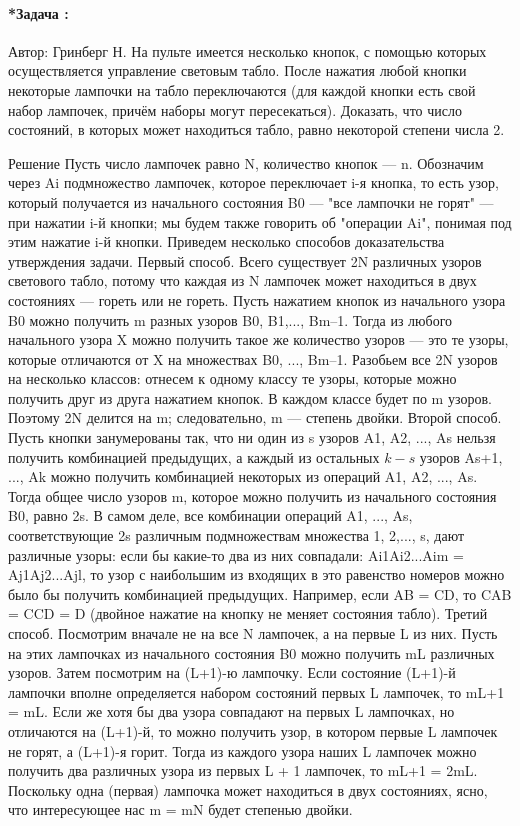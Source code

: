 \documentclass[amsmath,amssymb,12pt]{revtex4}
\newif\ifimportant
\newcommand{\1}{\frac{1}{2}}
\begin{document}
\addtocounter{prn}{1}
\vspace{0.3cm}
\paragraph*{*Задача \theprn: }

Автор: Гринберг Н.
На пульте имеется несколько кнопок, с помощью которых осуществляется управление световым табло. После нажатия любой кнопки некоторые лампочки на табло переключаются (для каждой кнопки есть свой набор лампочек, причём наборы могут пересекаться). Доказать, что число состояний, в которых может находиться табло, равно некоторой степени числа 2.


\ifimportant
\medskip
\noindent
Решение
   Пусть число лампочек равно N, количество кнопок — n. Обозначим через Ai подмножество лампочек, которое переключает i-я кнопка, то есть узор, который получается из начального состояния B0 — "все лампочки не горят" — при нажатии i-й кнопки; мы будем также говорить об "операции Ai", понимая под этим нажатие i-й кнопки. Приведем несколько способов доказательства утверждения задачи.
   Первый способ. Всего существует 2N различных узоров светового табло, потому что каждая из N лампочек может находиться в двух состояниях — гореть или не гореть. Пусть нажатием кнопок из начального узора B0 можно получить m разных узоров  B0, B1,..., Bm–1.
Тогда из любого начального узора X можно получить такое же количество узоров — это те узоры, которые отличаются от X на множествах
B0, ..., Bm–1.  Разобьем все 2N узоров на несколько классов: отнесем к одному классу те узоры, которые можно получить друг из друга нажатием кнопок. В каждом классе будет по m узоров. Поэтому 2N делится на m; следовательно, m — степень двойки.
   Второй способ. Пусть кнопки занумерованы так, что ни один из s узоров  A1, A2, ..., As  нельзя получить комбинацией предыдущих, а каждый из остальных  $k- s$  узоров  As+1, ..., Ak  можно получить комбинацией некоторых из операций  A1, A2, ..., As.  Тогда общее число узоров m, которое можно получить из начального состояния B0, равно 2s. В самом деле, все комбинации операций  A1, ..., As,  соответствующие 2s различным подмножествам множества  {1, 2,..., s},  дают различные узоры: если бы какие-то два из них совпадали:
Ai1Ai2...Aim = Aj1Aj2...Ajl,
то узор с наибольшим из входящих в это равенство номеров можно было бы получить комбинацией предыдущих. Например, если  AB = CD,  то   CAB = CCD = D   (двойное нажатие на кнопку не меняет состояния табло).
   Третий способ. Посмотрим вначале не на все N лампочек, а на первые L из них. Пусть на этих лампочках из начального состояния B0 можно получить mL различных узоров. Затем посмотрим на (L+1)-ю лампочку. Если состояние (L+1)-й лампочки вполне определяется набором состояний первых L лампочек, то  mL+1 = mL.  Если же хотя бы два узора совпадают на первых L лампочках, но отличаются на (L+1)-й, то можно получить узор, в котором первые L лампочек не горят, а (L+1)-я горит. Тогда из каждого узора наших L лампочек можно получить два различных узора из первых  L + 1  лампочек, то  mL+1 = 2mL.  Поскольку одна (первая) лампочка может находиться в двух состояниях, ясно, что интересующее нас  m = mN  будет степенью двойки.
\end{document}
